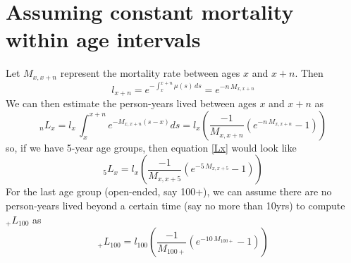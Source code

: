 \documentclass[twoside]{article}
\newcommand{\mysection}[1]{\addtocounter{section}{1}\section*{#1}}
\begin{document}
\mysection{Assuming constant mortality within age intervals}
Let $M_{x,x+n}$ represent the mortality rate between ages $x$ and $x+n$. Then 
\begin{equation}
l_{x+n}=e^{-\int_x^{x+n}\mu(s)\,ds}=e^{-n\,M_{x,x+n}}
\end{equation}
We can then estimate the person-years lived between ages $x$ and $x+n$ as
\begin{equation}
_nL_{x}=l_x\,\int_x^{x+n} e^{-M_{x,x+n}(s-x)} ds=l_x \left(\frac{-1}{M_{x,x+n}}(e^{-n\,M_{x,x+n}}-1) \right)
\label{Lx}
\end{equation}
so, if we have 5-year age groups, then equation \eqref{Lx} would look like
\begin{equation}
_5L_{x}=l_x \left(\frac{-1}{M_{x,x+5}}(e^{-5\,M_{x,x+5}}-1) \right)
\end{equation}
For the last age group (open-ended, say 100+), we can assume there are no person-years lived beyond a certain time (say no more than 10yrs) to compute $_+L_{100}$ as
\begin{equation}
_+L_{100}=l_{100} \left(\frac{-1}{M_{100+}}(e^{-10\,M_{100+}}-1) \right)
\end{equation}
\end{document}
